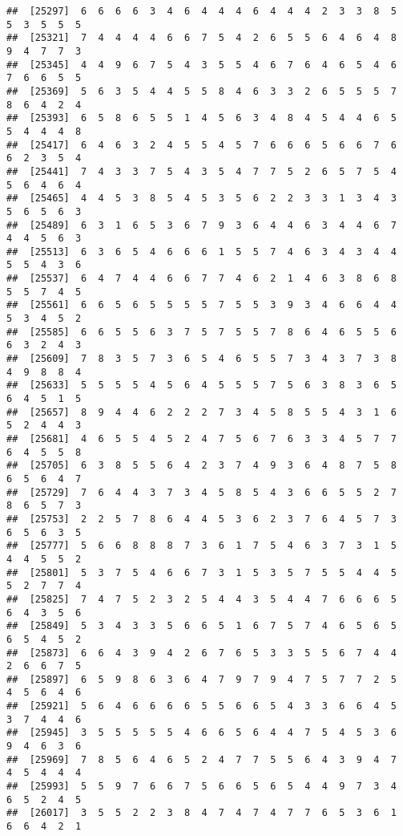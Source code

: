 \documentclass[
]{book}
\begin{document}
\begin{verbatim}
##  [25297]  6  6  6  6  3  4  6  4  4  4  6  4  4  4  2  3  3  8  5  5  3  5  5  5
##  [25321]  7  4  4  4  4  6  6  7  5  4  2  6  5  5  6  4  6  4  8  9  4  7  7  3
##  [25345]  4  4  9  6  7  5  4  3  5  5  4  6  7  6  4  6  5  4  6  7  6  6  5  5
##  [25369]  5  6  3  5  4  4  5  5  8  4  6  3  3  2  6  5  5  5  7  8  6  4  2  4
##  [25393]  6  5  8  6  5  5  1  4  5  6  3  4  8  4  5  4  4  6  5  5  4  4  4  8
##  [25417]  6  4  6  3  2  4  5  5  4  5  7  6  6  6  5  6  6  7  6  6  2  3  5  4
##  [25441]  7  4  3  3  7  5  4  3  5  4  7  7  5  2  6  5  7  5  4  5  6  4  6  4
##  [25465]  4  4  5  3  8  5  4  5  3  5  6  2  2  3  3  1  3  4  3  5  6  5  6  3
##  [25489]  6  3  1  6  5  3  6  7  9  3  6  4  4  6  3  4  4  6  7  4  4  5  6  3
##  [25513]  6  3  6  5  4  6  6  6  1  5  5  7  4  6  3  4  3  4  4  5  5  4  3  6
##  [25537]  6  4  7  4  4  6  6  7  7  4  6  2  1  4  6  3  8  6  8  5  5  7  4  5
##  [25561]  6  6  5  6  5  5  5  5  7  5  5  3  9  3  4  6  6  4  4  5  3  4  5  2
##  [25585]  6  6  5  5  6  3  7  5  7  5  5  7  8  6  4  6  5  5  6  6  3  2  4  3
##  [25609]  7  8  3  5  7  3  6  5  4  6  5  5  7  3  4  3  7  3  8  4  9  8  8  4
##  [25633]  5  5  5  5  4  5  6  4  5  5  5  7  5  6  3  8  3  6  5  6  4  5  1  5
##  [25657]  8  9  4  4  6  2  2  2  7  3  4  5  8  5  5  4  3  1  6  5  2  4  4  3
##  [25681]  4  6  5  5  4  5  2  4  7  5  6  7  6  3  3  4  5  7  7  6  4  5  5  8
##  [25705]  6  3  8  5  5  6  4  2  3  7  4  9  3  6  4  8  7  5  8  6  5  6  4  7
##  [25729]  7  6  4  4  3  7  3  4  5  8  5  4  3  6  6  5  5  2  7  8  6  5  7  3
##  [25753]  2  2  5  7  8  6  4  4  5  3  6  2  3  7  6  4  5  7  3  6  5  6  3  5
##  [25777]  5  6  6  8  8  8  7  3  6  1  7  5  4  6  3  7  3  1  5  4  4  5  5  2
##  [25801]  5  3  7  5  4  6  6  7  3  1  5  3  5  7  5  5  4  4  5  5  2  7  7  4
##  [25825]  7  4  7  5  2  3  2  5  4  4  3  5  4  4  7  6  6  6  5  6  4  3  5  6
##  [25849]  5  3  4  3  3  5  6  6  5  1  6  7  5  7  4  6  5  6  5  6  5  4  5  2
##  [25873]  6  6  4  3  9  4  2  6  7  6  5  3  3  5  5  6  7  4  4  2  6  6  7  5
##  [25897]  6  5  9  8  6  3  6  4  7  9  7  9  4  7  5  7  7  2  5  4  5  6  4  6
##  [25921]  5  6  4  6  6  6  6  5  5  6  6  5  4  3  3  6  6  4  5  3  7  4  4  6
##  [25945]  3  5  5  5  5  5  4  6  6  5  6  4  4  7  5  4  5  3  6  9  4  6  3  6
##  [25969]  7  8  5  6  4  6  5  2  4  7  7  5  5  6  4  3  9  4  7  4  5  4  4  4
##  [25993]  5  5  9  7  6  6  7  5  6  6  5  6  5  4  4  9  7  3  4  6  5  2  4  5
##  [26017]  3  5  5  2  2  3  8  4  7  4  7  4  7  7  6  5  3  6  1  6  6  4  2  1

\end{verbatim}
\end{document}
